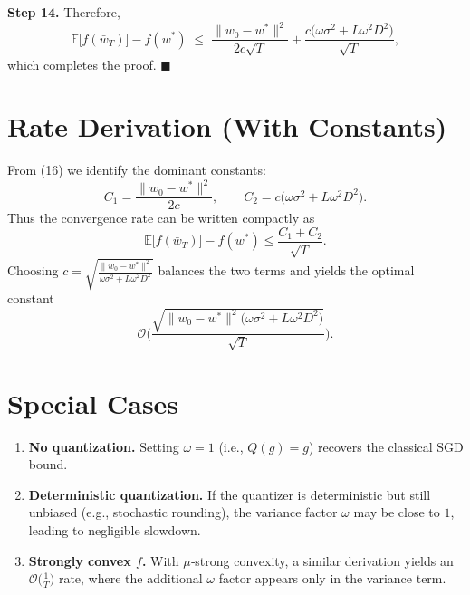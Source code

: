 \documentclass[11pt]{article}
\newcommand{\E}{\mathbb{E}}
\begin{document}
\noindent\textbf{Step 14.} Therefore,
\[
\E\!\big[f(\bar w_{T})\big]-f(w^{*})
\;\le\;
\frac{\|w_{0}-w^{*}\|^{2}}{2c\sqrt{T}}
   +\frac{c\big(\omega\sigma^{2}+L\omega^{2}D^{2}\big)}{\sqrt{T}},
\]
which completes the proof. \hfill $\blacksquare$

\section*{Rate Derivation (With Constants)}
From (16) we identify the dominant constants:
\[
C_{1}= \frac{\|w_{0}-w^{*}\|^{2}}{2c},\qquad
C_{2}=c\big(\omega\sigma^{2}+L\omega^{2}D^{2}\big).
\]
Thus the convergence rate can be written compactly as
\[
\E\!\big[f(\bar w_{T})\big]-f(w^{*})\le \frac{C_{1}+C_{2}}{\sqrt{T}}.
\]
Choosing $c=\sqrt{\frac{\|w_{0}-w^{*}\|^{2}}{\omega\sigma^{2}+L\omega^{2}D^{2}}}$ balances the two terms and yields the optimal constant
\[
\mathcal{O}\!\Bigg(\frac{\sqrt{\|w_{0}-w^{*}\|^{2}\big(\omega\sigma^{2}+L\omega^{2}D^{2}\big)}}{\sqrt{T}}\Bigg).
\]

\section*{Special Cases}
\begin{enumerate}[leftmargin=*]
\item \textbf{No quantization.} Setting $\omega=1$ (i.e., $Q(g)=g$) recovers the classical SGD bound.
\item \textbf{Deterministic quantization.} If the quantizer is deterministic but still unbiased (e.g., stochastic rounding), the variance factor $\omega$ may be close to $1$, leading to negligible slowdown.
\item \textbf{Strongly convex $f$.} With $\mu$‑strong convexity, a similar derivation yields an $\mathcal{O}\!\big(\frac{1}{T}\big)$ rate, where the additional $\omega$ factor appears only in the variance term.
\end{enumerate}
\end{document}
